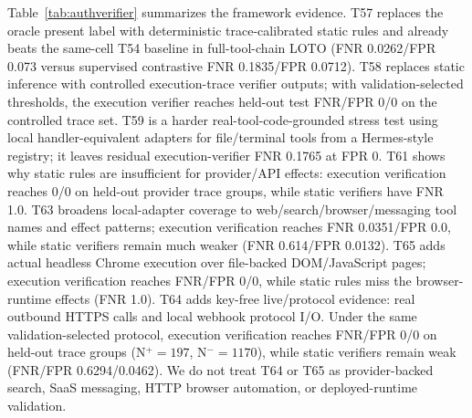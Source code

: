 \documentclass{article}
\begin{document}
Table~\ref{tab:authverifier} summarizes the framework evidence. T57 replaces the oracle present label with deterministic trace-calibrated static rules and already beats the same-cell T54 baseline in full-tool-chain LOTO (FNR 0.0262/FPR 0.073 versus supervised contrastive FNR 0.1835/FPR 0.0712). T58 replaces static inference with controlled execution-trace verifier outputs; with validation-selected thresholds, the execution verifier reaches held-out test FNR/FPR 0/0 on the controlled trace set. T59 is a harder real-tool-code-grounded stress test using local handler-equivalent adapters for file/terminal tools from a Hermes-style registry; it leaves residual execution-verifier FNR 0.1765 at FPR 0. T61 shows why static rules are insufficient for provider/API effects: execution verification reaches 0/0 on held-out provider trace groups, while static verifiers have FNR 1.0. T63 broadens local-adapter coverage to web/search/browser/messaging tool names and effect patterns; execution verification reaches FNR 0.0351/FPR 0.0, while static verifiers remain much weaker (FNR 0.614/FPR 0.0132). T65 adds actual headless Chrome execution over file-backed DOM/JavaScript pages; execution verification reaches FNR/FPR 0/0, while static rules miss the browser-runtime effects (FNR 1.0). T64 adds key-free live/protocol evidence: real outbound HTTPS calls and local webhook protocol I/O. Under the same validation-selected protocol, execution verification reaches FNR/FPR 0/0 on held-out trace groups (N$^+=197$, N$^-=1170$), while static verifiers remain weak (FNR/FPR 0.6294/0.0462). We do not treat T64 or T65 as provider-backed search, SaaS messaging, HTTP browser automation, or deployed-runtime validation.

\begin{table}[t]
\centering
\caption{Action-level aggregation of the same validation-selected monitor outputs. U-Allow is Unauthorized Action Allow Rate; FDeny is Authorized Action False Denial Rate. These metrics expose policy-level tradeoffs that candidate-effect row FNR/FPR can hide.}
\label{tab:actionlevel}
\end{table}
\end{document}
